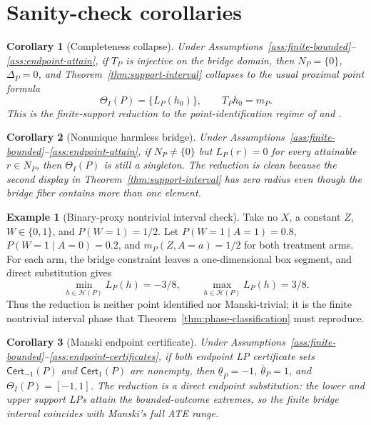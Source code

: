 \documentclass[11pt]{article}
\newcommand{\calH}{\mathcal{H}}
\theoremstyle{definition}
\newtheorem{example}{Example}
\theoremstyle{plain}
\newtheorem{corollary}{Corollary}
\theoremstyle{remark}
\begin{document}
\section{Sanity-check corollaries}
\begin{corollary}[Completeness collapse]\label{cor:complete-collapse}
Under Assumptions~\ref{ass:finite-bounded}--\ref{ass:endpoint-attain}, if
\(T_P\) is injective on the bridge domain, then \(N_P=\{0\}\),
\(\Delta_P=0\), and Theorem~\ref{thm:support-interval} collapses to the usual
proximal point formula
\[
\Theta_I(P)=\{L_P(h_0)\},
\qquad T_Ph_0=m_P.
\]
This is the finite-support reduction to the point-identification regime of
\citet{MiaoGengTchetgen2018Biometrika} and
\citet{CuiPuShiMiaoTchetgen2024JASA}.
\end{corollary}

\begin{corollary}[Nonunique harmless bridge]\label{cor:nonunique-harmless}
Under Assumptions~\ref{ass:finite-bounded}--\ref{ass:endpoint-attain}, if
\(N_P\neq\{0\}\) but \(L_P(r)=0\) for every attainable \(r\in N_P\), then
\(\Theta_I(P)\) is still a singleton.  The reduction is clean because the
second display in Theorem~\ref{thm:support-interval} has zero radius even
though the bridge fiber contains more than one element.
\end{corollary}

\begin{example}[Binary-proxy nontrivial interval check]\label{ex:binary-nontrivial}
Take no \(X\), a constant \(Z\), \(W\in\{0,1\}\), and
\(P(W=1)=1/2\).  Let
\(P(W=1\mid A=1)=0.8\), \(P(W=1\mid A=0)=0.2\), and
\(m_P(Z,A=a)=1/2\) for both treatment arms.  For each arm, the bridge
constraint leaves a one-dimensional box segment, and direct substitution
gives
\[
\min_{h\in\calH(P)} L_P(h)=-3/8,\qquad
\max_{h\in\calH(P)} L_P(h)=3/8 .
\]
Thus the reduction is neither point identified nor Manski-trivial; it is the
finite nontrivial interval phase that Theorem~\ref{thm:phase-classification}
must reproduce.
\end{example}

\begin{corollary}[Manski endpoint certificate]\label{cor:manski-cert}
Under Assumptions~\ref{ass:finite-bounded}--\ref{ass:endpoint-certificates},
if both endpoint LP certificate sets \(\mathsf{Cert}_{-1}(P)\) and
\(\mathsf{Cert}_{1}(P)\) are nonempty, then
\(\underline\theta_P=-1\), \(\overline\theta_P=1\), and
\(\Theta_I(P)=[-1,1]\).  The reduction is a direct endpoint substitution:
the lower and upper support LPs attain the bounded-outcome extremes, so the
finite bridge interval coincides with Manski's full ATE range.
\end{corollary}
\end{document}
